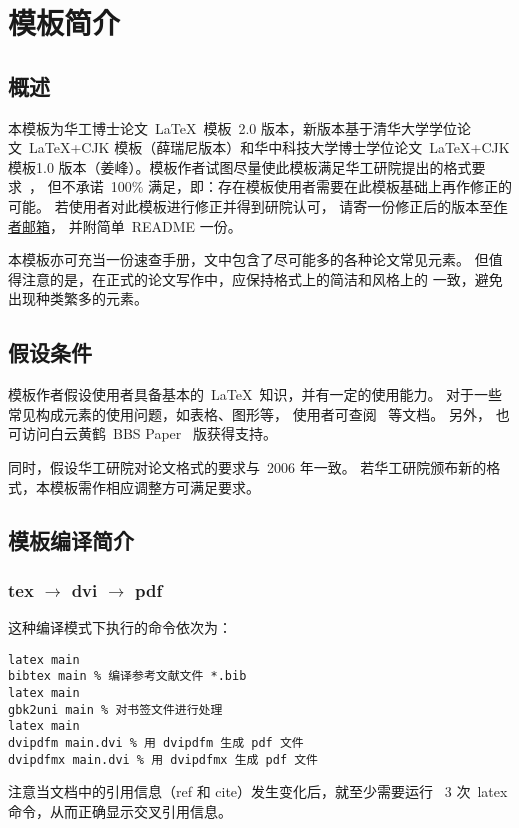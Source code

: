 
\chapter{模板简介}
\label{cha:intro}

\section{概述}
\label{sec:general intro}

本模板为华工博士论文~\LaTeX~模板~2.0
版本，新版本基于清华大学学位论文~\LaTeX+CJK
模板（薛瑞尼版本）和华中科技大学博士学位论文~\LaTeX+CJK 模板1.0
版本（姜峰）。模板作者试图尽量使此模板满足华工研院提出的格式要求~\cite{meng}，
但不承诺~100\%
满足，即：存在模板使用者需要在此模板基础上再作修正的可能。
若使用者对此模板进行修正并得到研院认可，
请寄一份修正后的版本至\href{hust_liuhuikan@yeah.net}{作者邮箱}，
并附简单~README 一份。

本模板亦可充当一份速查手册，文中包含了尽可能多的各种论文常见元素。
但值得注意的是，在正式的论文写作中，应保持格式上的简洁和风格上的
一致，避免出现种类繁多的元素。

\section{假设条件}
\label{sec:assumption}

模板作者假设使用者具备基本的~\LaTeX~知识，并有一定的使用能力。
对于一些常见构成元素的使用问题，如表格、图形等，
使用者可查阅~ 等文档。 另外，
也可访问白云黄鹤~BBS Paper~ 版获得支持。

同时，假设华工研院对论文格式的要求与~2006 年一致。
若华工研院颁布新的格式，本模板需作相应调整方可满足要求。

\section{模板编译简介}
\label{sec:compile}

\subsection{tex $\rightarrow$ dvi $\rightarrow$ pdf}
\label{sec:dvipdf}

这种编译模式下执行的命令依次为：
\begin{verbatim}
latex main
bibtex main % 编译参考文献文件 *.bib
latex main
gbk2uni main % 对书签文件进行处理
latex main
dvipdfm main.dvi % 用 dvipdfm 生成 pdf 文件
dvipdfmx main.dvi % 用 dvipdfmx 生成 pdf 文件
\end{verbatim}
注意当文档中的引用信息（ref 和 cite）发生变化后，就至少需要运行~
3 次~latex 命令，从而正确显示交叉引用信息。

